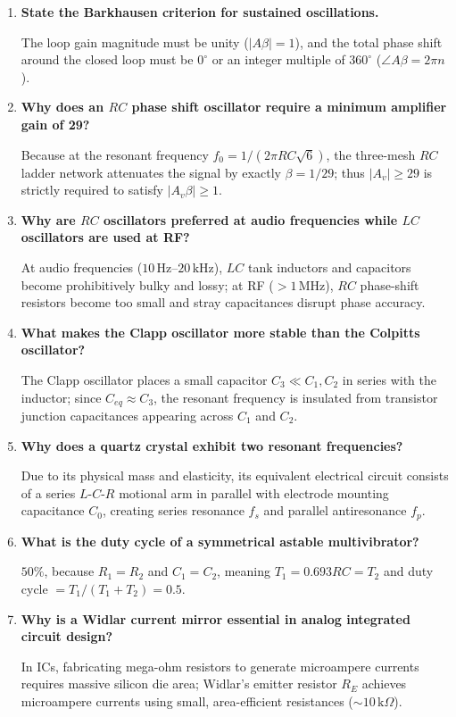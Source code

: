 \documentclass[12pt,a4paper]{article}
\newcommand{\Q}[1]{\textbf{#1}\par\noindent\ignorespaces}
\begin{document}
\begin{tcolorbox}[exambox, title={Frequently Asked / Viva Questions}]
\begin{enumerate}[topsep=0pt, label=\textbf{Q\arabic*.}, itemsep=5pt]
  \item \Q{State the Barkhausen criterion for sustained oscillations.}
  The loop gain magnitude must be unity ($|A\beta| = 1$), and the total phase shift around the closed loop must be $0^\circ$ or an integer multiple of $360^\circ$ ($\angle A\beta = 2\pi n$).

  \item \Q{Why does an $RC$ phase shift oscillator require a minimum amplifier gain of 29?}
  Because at the resonant frequency $f_0 = 1/(2\pi RC\sqrt{6})$, the three-mesh $RC$ ladder network attenuates the signal by exactly $\beta = 1/29$; thus $|A_v| \ge 29$ is strictly required to satisfy $|A_v\beta| \ge 1$.

  \item \Q{Why are $RC$ oscillators preferred at audio frequencies while $LC$ oscillators are used at RF?}
  At audio frequencies ($10\,\mathrm{Hz}$--$20\,\mathrm{kHz}$), $LC$ tank inductors and capacitors become prohibitively bulky and lossy; at RF ($> 1\,\mathrm{MHz}$), $RC$ phase-shift resistors become too small and stray capacitances disrupt phase accuracy.

  \item \Q{What makes the Clapp oscillator more stable than the Colpitts oscillator?}
  The Clapp oscillator places a small capacitor $C_3 \ll C_1, C_2$ in series with the inductor; since $C_{eq} \approx C_3$, the resonant frequency is insulated from transistor junction capacitances appearing across $C_1$ and $C_2$.

  \item \Q{Why does a quartz crystal exhibit two resonant frequencies?}
  Due to its physical mass and elasticity, its equivalent electrical circuit consists of a series $L$-$C$-$R$ motional arm in parallel with electrode mounting capacitance $C_0$, creating series resonance $f_s$ and parallel antiresonance $f_p$.

  \item \Q{What is the duty cycle of a symmetrical astable multivibrator?}
  $50\%$, because $R_1=R_2$ and $C_1=C_2$, meaning $T_1 = 0.693 RC = T_2$ and duty cycle $= T_1/(T_1+T_2) = 0.5$.

  \item \Q{Why is a Widlar current mirror essential in analog integrated circuit design?}
  In ICs, fabricating mega-ohm resistors to generate microampere currents requires massive silicon die area; Widlar's emitter resistor $R_E$ achieves microampere currents using small, area-efficient resistances ($\sim 10\,\mathrm{k}\Omega$).


\end{enumerate}
\end{tcolorbox}
\end{document}
